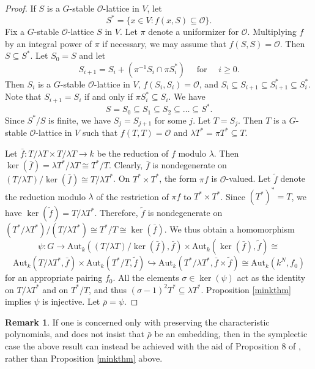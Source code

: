 \documentclass{amsart}
\def\f{{\tilde F}}
\def\Aut{\mathrm{Aut}}
\def\f{f}
\def\O{{\mathcal O}}
\theoremstyle{definition}
\newtheorem{rem}[thm]{Remark}
\begin{document}
\begin{proof}
If $S$ is a $G$-stable $\O$-lattice in $V$, let
$$S^* = \{x \in V : {\f}(x,S) \subseteq \O \}.$$
Fix a $G$-stable $\O$-lattice $S$ in $V$.
Let $\pi$ denote a uniformizer for $\O$.
Multiplying ${\f}$ by an integral
power of $\pi$ if necessary, we may assume
that ${\f}(S,S) = \O$. Then $S \subseteq S^*$. 
Let $S_0=S$ and let
$$S_{i+1} = S_i + (\pi^{-1}S_i \cap \pi S_i^*) \quad 
\text{ for } \quad  i \ge 0.$$
Then $S_i$ is a $G$-stable $\O$-lattice in $V$,
${\f}(S_i,S_i) = \O$, and 
$S_i \subseteq S_{i+1} \subseteq S_{i+1}^* \subseteq S_i^*$.
Note that $S_{i+1} = S_i$ if and only if 
$\pi S_i^* \subseteq S_i$.
We have
$$S = S_0 \subseteq S_1 \subseteq S_2 \subseteq 
\ldots \subseteq S^*.$$
Since $S^*/S$ is finite, we have $S_j = S_{j+1}$
for some $j$. Let $T = S_j$.
Then $T$ is a $G$-stable 
$\O$-lattice in $V$ such that ${\f}(T,T) = \O$ and 
$\lambda T^* = \pi T^* \subseteq T$.

Let ${\bar \f} : T/\lambda T \times T/\lambda T \to k$
be the reduction of ${\f}$ modulo $\lambda$.
Then $\ker({\bar \f}) = \lambda T^*/\lambda T \cong T^*/T$.
Clearly, ${\bar \f}$ is nondegenerate on
$(T/\lambda T)/\ker({\bar {\f}}) \cong T/\lambda T^*$.
On $T^* \times T^*$, the form $\pi {\f}$ is $\O$-valued.
Let ${\tilde {\f}}$ denote the reduction modulo $\lambda$
of the restriction of $\pi {\f}$ to $T^* \times T^*$. 
Since $(T^*)^*=T$, we have $\ker({\tilde {\f}}) = T/\lambda T^*$. 
Therefore, ${\tilde {\f}}$ is nondegenerate
on $(T^*/\lambda T^*)/(T/\lambda T^*) \cong T^*/T \cong 
\ker({\bar {\f}})$.
We thus obtain a homomorphism
$$\psi : G \to 
\Aut_k((T/\lambda T)/\ker({\bar {\f}}),{\bar {\f}}) \times
\Aut_k(\ker({\bar {\f}}),{\tilde {\f}}) \cong$$
$$\Aut_k(T/\lambda T^*,{\bar {\f}}) \times
\Aut_k(T^*/T,{\tilde {\f}})
\hookrightarrow \Aut_k(T^*/\lambda T^*, {\bar {\f}} \times {\tilde {\f}}) 
\cong \Aut_k(k^N,{\f}_0)$$
for an appropriate pairing ${\f}_0$.
All the elements $\sigma\in\ker(\psi)$ act 
as the identity on $T/\lambda T^*$ and on $T^*/T$, and thus
$(\sigma-1)^2T^* \subseteq \lambda T^*$.
Proposition \ref{minkthm} implies $\psi$ is injective.  
Let ${\bar \rho} = \psi$.
\end{proof}

\begin{rem}
If one is concerned only with preserving the characteristic polynomials, 
and does not insist that ${\bar \rho}$ be an embedding, then in the
symplectic case the above
result can instead be achieved with the aid of Proposition 8 
of \cite{Serre1996}, rather than Proposition \ref{minkthm} above.
\end{rem}
\end{document}
